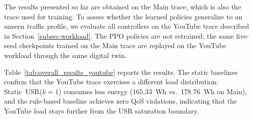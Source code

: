 \documentclass[a4paper,fleqn]{cas-sc}
\begin{document}
The results presented so far are obtained on the Main trace, which is also the trace used for training. To assess whether the learned policies generalize to an unseen traffic profile, we evaluate all controllers on the YouTube trace described in Section~\ref{subsec:workload}. The PPO policies are not retrained; the same five-seed checkpoints trained on the Main trace are replayed on the YouTube workload through the same digital twin.

Table~\ref{tab:overall_results_youtube} reports the results. The static baselines confirm that the YouTube trace exercises a different load distribution: Static~USR($k=1$) consumes less energy (165.33~Wh vs.\ 178.76~Wh on Main), and the rule-based baseline achieves zero QoS violations, indicating that the YouTube load stays further from the USR saturation boundary.

\begin{table}[width=.9\linewidth,cols=7,pos=h]
\centering
\caption{Overall results on the YouTube trace (cross-trace generalization). The PPO policies are identical to those trained on the Main trace and are not retrained. Notation follows Table~\ref{tab:overall_results}.}
\label{tab:overall_results_youtube}
\small
{}
\end{table}
\end{document}
